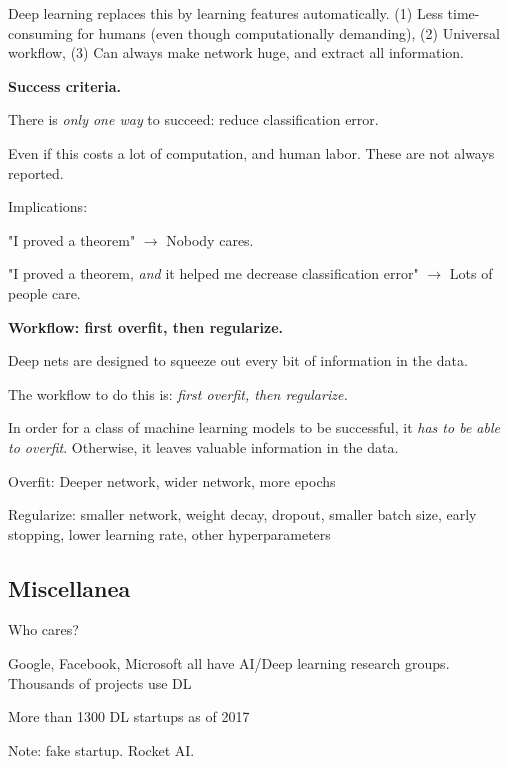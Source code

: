\documentclass[english]{article}
\begin{document}
\item Deep learning replaces this by learning features automatically. (1) Less time-consuming for humans (even though computationally demanding), (2) Universal workflow, (3) Can always make network huge, and extract all information. 

\eenum 


\item {\bf Success criteria.}

\benum 
\item There is \emph{only one way} to succeed: reduce classification error. 
\item Even if this costs a lot of computation, and human labor. These are not always reported. 
\item Implications: 

"I proved a theorem" $\to$ Nobody cares.

"I proved a theorem, \emph{and} it helped me decrease classification error" $\to$ Lots of people care.


\eenum 


\item {\bf Workflow: first overfit, then regularize.}

\benum 
\item Deep nets are designed to squeeze out every bit of information in the data.
\item The workflow to do this is: \emph{first overfit, then regularize.}
\item In order for a class of machine learning models to be successful, it \emph{has to be able to overfit}. Otherwise, it leaves valuable information in the data. 

Overfit: Deeper network, wider network, more epochs

\item Regularize: smaller network, weight decay, dropout, smaller batch size, early stopping, lower learning rate, other hyperparameters

\eenum 


\eenum 


\subsection{Miscellanea}
\benum 
\item Who cares?
\bitem
\item Google, Facebook, Microsoft all have AI/Deep learning research groups. Thousands of projects use DL
\item More than 1300 DL startups as of 2017
\item Note: fake startup. Rocket AI. 
\end{document}
